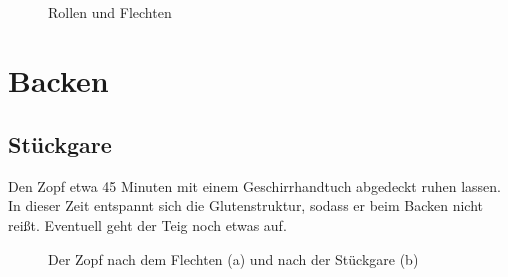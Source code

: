 \documentclass[a4paper, oneside]{recipe}
\begin{document}
\begin{figure}[h]
  \centering
  \quad
   \\
  \quad
  \caption{Rollen und Flechten}
  \label{fig:flechten}
\end{figure}

\section*{Backen}
\subsection*{Stückgare}
Den Zopf etwa 45 Minuten mit einem Geschirrhandtuch abgedeckt ruhen lassen. In dieser Zeit entspannt sich die Glutenstruktur, sodass er beim Backen nicht reißt. Eventuell geht der Teig noch etwas auf.

\begin{figure}[!ht]
  \centering
  \quad
  \label{fig:vor_nach_stueckgare}
  \caption{Der Zopf nach dem Flechten (a) und nach der Stückgare (b)}
\end{figure}
\end{document}
